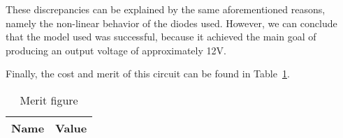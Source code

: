 These discrepancies can be explained by the same aforementioned reasons, namely the non-linear behavior of the diodes used. However, we can conclude that the model used was successful, because it achieved the main goal of producing an output voltage of approximately 12V. 

Finally, the cost and merit of this circuit can be found in Table~\ref{tab:merit}.


\begin{table}[ht]
  \centering
  \begin{tabular}{|l|r|}
    \hline    
    {\bf Name} & {\bf Value} \\ \hline
        
  \end{tabular}
  \caption{Merit figure} 
        \label{tab:merit}
\end{table}     










